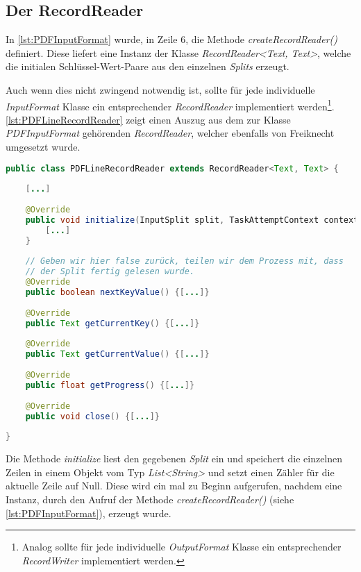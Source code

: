 \subsection{Der RecordReader}\label{subsec:RecordReader}
In \autoref{lst:PDFInputFormat} wurde, in Zeile 6, die Methode \textit{createRecordReader()} definiert. Diese liefert eine Instanz der Klasse \textit{RecordReader<Text, Text>}, welche die initialen Schlüssel-Wert-Paare aus den einzelnen \textit{Splits} erzeugt.

Auch wenn dies nicht zwingend notwendig ist, sollte für jede individuelle \textit{InputFormat} Klasse ein entsprechender \textit{RecordReader} implementiert werden\footnote{Analog sollte für jede individuelle \textit{OutputFormat} Klasse ein entsprechender \textit{RecordWriter} implementiert werden.}. \autoref{lst:PDFLineRecordReader} zeigt einen Auszug aus dem zur Klasse \textit{PDFInputFormat} gehörenden \textit{RecordReader}, welcher ebenfalls von Freiknecht umgesetzt wurde. \\

\begin{lstlisting}[language=Java,caption=Auszug aus der Klasse \textit{PDFLineRecordReader},title=\autoref*{lst:PDFLineRecordReader}: Auszug aus der Klasse \textit{PDFLineRecordReader}\protect\footnotemark,label=lst:PDFLineRecordReader]
public class PDFLineRecordReader extends RecordReader<Text, Text> {
	
	[...]
	
	@Override
	public void initialize(InputSplit split, TaskAttemptContext context) {
		[...]
	}
	
	// Geben wir hier false zurück, teilen wir dem Prozess mit, dass
	// der Split fertig gelesen wurde.
	@Override
	public boolean nextKeyValue() {[...]}
	
	@Override
	public Text getCurrentKey() {[...]}
		
	@Override
	public Text getCurrentValue() {[...]}
			
	@Override
	public float getProgress() {[...]}
	
	@Override
	public void close() {[...]}
	
}
\end{lstlisting}

Die Methode \textit{initialize} liest den gegebenen \textit{Split} ein und speichert die einzelnen Zeilen in einem Objekt vom Typ \textit{List<String>} und setzt einen Zähler für die aktuelle Zeile auf Null. Diese wird ein mal zu Beginn aufgerufen, nachdem eine Instanz, durch den Aufruf der Methode \textit{createRecordReader()} (siehe \autoref{lst:PDFInputFormat}), erzeugt wurde.

